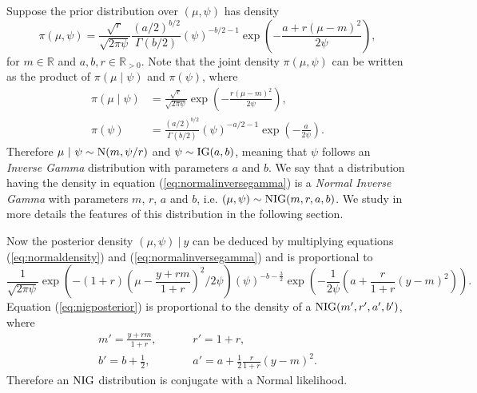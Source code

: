 Suppose the prior distribution over $(\mu,\psi)$ has density
\begin{equation}
\label{eq:normalinversegamma}
\pi(\mu,\psi)= \frac{\sqrt{r}}{\sqrt{2\pi\psi}}\frac{(a/2)^{b/2}}{\Gamma(b/2)}\left(\psi\right)^{-b/2-1}\exp\left( -\frac{a+r(\mu-m)^2}{2\psi}\right),
\end{equation}
for $m\in\mathbb{R}$ and $a,b,r\in\mathbb{R}_{>0}$. Note that the joint density $\pi(\mu,\psi)$ can be written as the product of $\pi(\mu\;|\;\psi)$ and $\pi(\psi)$, where
\begin{align*}
\pi(\mu\;|\;\psi)&= \frac{\sqrt{r}}{\sqrt{2\pi\psi}}\exp\left( -\frac{r(\mu-m)^2}{2\psi}\right),\\
\pi(\psi)&=\frac{(a/2)^{b/2}}{\Gamma(b/2)}\left(\psi\right)^{-a/2-1}\exp\left(-\frac{a}{2\psi}\right).
\end{align*}
Therefore $\mu~|~\psi\sim \textnormal{N}(m,\psi/r)$ and $\psi\sim \textnormal{IG}(a,b)$, meaning that $\psi$ follows an \textit{Inverse Gamma} distribution with parameters $a$ and $b$. We  say that a distribution having the density in equation (\ref{eq:normalinversegamma}) is a \textit{Normal Inverse Gamma} with parameters $m$, $r$, $a$ and $b$, i.e. $(\mu,\psi)\sim \textnormal{NIG}(m,r,a,b)$. We  study in more details the features of this distribution in the following section.

Now the posterior density $(\mu,\psi)~|~y$ can be deduced by multiplying equations (\ref{eq:normaldensity}) and (\ref{eq:normalinversegamma}) and is proportional to
\begin{equation}
\label{eq:nigposterior}
\frac{1}{\sqrt{2\pi\psi}}\exp\left(-(1+r)\left(\mu-\frac{y+rm}{1+r}\right)^2/2\psi\right)\left(\psi\right)^{-b-\frac{3}{2}}\exp\left(-\frac{1}{2\psi}\left(a+\frac{r}{1+r}(y-m)^2\right)\right).
\end{equation}
Equation (\ref{eq:nigposterior}) is proportional to the density of a $\textnormal{NIG}(m',r',a',b')$, where 
\begin{equation*}
\begin{array}{lcccl}
m'=\frac{y+rm}{1+r},&&&&r'=1+r,\\
b'=b+\frac{1}{2},&&&&a'=a+\frac{1}{2}\frac{r}{1+r}(y-m)^2.
\end{array}
\end{equation*}
Therefore an $\textnormal{NIG}$ distribution is  conjugate with a Normal likelihood. 


